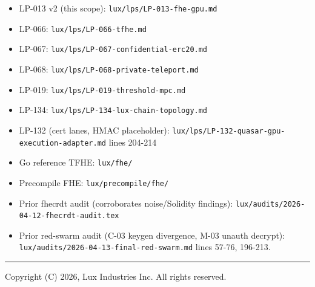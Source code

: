 \documentclass[
]{article}
\providecommand{\tightlist}{%
  \setlength{\itemsep}{0pt}\setlength{\parskip}{0pt}}
\begin{document}
\begin{itemize}
\tightlist
\item
  LP-013 v2 (this scope): \texttt{lux/lps/LP-013-fhe-gpu.md}
\item
  LP-066: \texttt{lux/lps/LP-066-tfhe.md}
\item
  LP-067: \texttt{lux/lps/LP-067-confidential-erc20.md}
\item
  LP-068: \texttt{lux/lps/LP-068-private-teleport.md}
\item
  LP-019: \texttt{lux/lps/LP-019-threshold-mpc.md}
\item
  LP-134: \texttt{lux/lps/LP-134-lux-chain-topology.md}
\item
  LP-132 (cert lanes, HMAC placeholder):
  \texttt{lux/lps/LP-132-quasar-gpu-execution-adapter.md} lines 204-214
\item
  Go reference TFHE: \texttt{lux/fhe/}
\item
  Precompile FHE: \texttt{lux/precompile/fhe/}
\item
  Prior fhecrdt audit (corroborates noise/Solidity findings):
  \texttt{lux/audits/2026-04-12-fhecrdt-audit.tex}
\item
  Prior red-swarm audit (C-03 keygen divergence, M-03 unauth decrypt):
  \texttt{lux/audits/2026-04-13-final-red-swarm.md} lines 57-76,
  196-213.
\end{itemize}

\begin{center}\rule{0.5\linewidth}{0.5pt}\end{center}

Copyright (C) 2026, Lux Industries Inc. All rights reserved.
\end{document}
